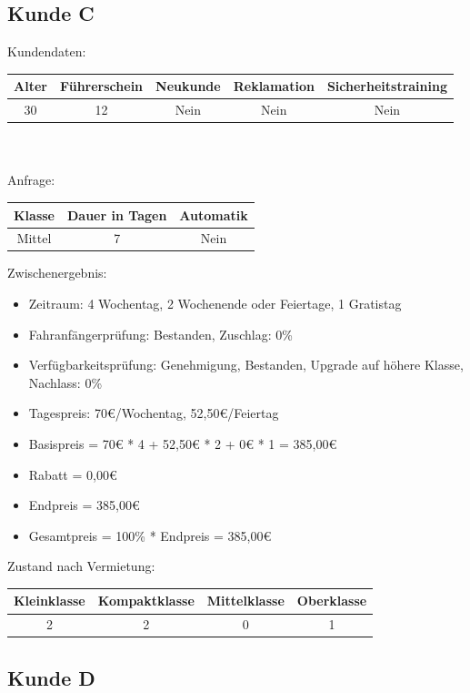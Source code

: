 \subsection{Kunde C}

Kundendaten:\\
\begin{tabular}{|c|c|c|c|c|}
	\hline \textbf{Alter} & \textbf{Führerschein} & \textbf{Neukunde} & \textbf{Reklamation} & \textbf{Sicherheitstraining} \\ 
	\hline 30 & 12 & Nein & Nein & Nein \\ 
	\hline 
\end{tabular} 
\\\\
Anfrage:\\
\begin{tabular}{|c|c|c|}
	\hline \textbf{Klasse} & \textbf{Dauer in Tagen} & \textbf{Automatik} \\ 
	\hline Mittel & 7 & Nein \\ 
	\hline 
\end{tabular}

Zwischenergebnis:
\begin{itemize}
	\item Zeitraum: 4 Wochentag, 2 Wochenende oder Feiertage, 1 Gratistag
	\item Fahranfängerprüfung: Bestanden, Zuschlag: 0\%
	\item Verfügbarkeitsprüfung: Genehmigung, Bestanden, Upgrade auf höhere Klasse, Nachlass: 0\%
	\item Tagespreis: 70€/Wochentag, 52,50€/Feiertag
	\item Basispreis = 70€ * 4 + 52,50€ * 2 + 0€ * 1 = 385,00€
	\item Rabatt = 0,00€
	\item Endpreis = 385,00€
	\item Gesamtpreis = 100\% * Endpreis = 385,00€
\end{itemize}

Zustand nach Vermietung:\\
\begin{tabular}{|c|c|c|c|}
	\hline \textbf{Kleinklasse} & \textbf{Kompaktklasse} & \textbf{Mittelklasse} & \textbf{Oberklasse}  \\ 
	\hline 2 & 2 & 0 & 1 \\ 
	\hline 
\end{tabular} 

\subsection{Kunde D}

